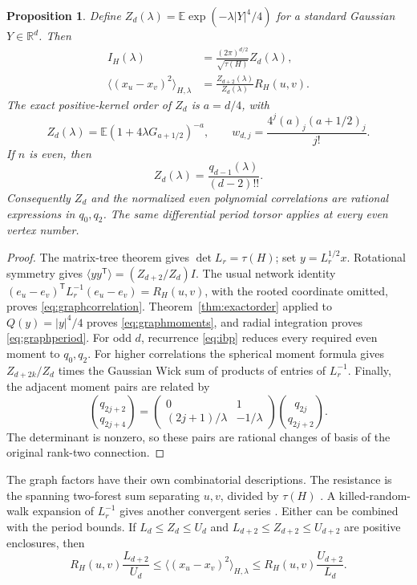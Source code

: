 \documentclass[11pt]{article}
\newtheorem{proposition}[theorem]{Proposition}
\theoremstyle{definition}
\newcommand{\E}{\mathbb E}
\numberwithin{equation}{section}
\begin{document}
\begin{proposition}\label{prop:graphfield}
Define $Z_d(\lambda)=\E\exp(-\lambda |Y|^4/4)$ for a standard Gaussian
$Y\in\mathbb R^d$. Then
\begin{align}
 I_H(\lambda)&=\frac{(2\pi)^{d/2}}{\sqrt{\tau(H)}}Z_d(\lambda),
 \label{eq:graphpartition}\\
 \langle(x_u-x_v)^2\rangle_{H,\lambda}
 &=\frac{Z_{d+2}(\lambda)}{Z_d(\lambda)}R_H(u,v).
 \label{eq:graphcorrelation}
\end{align}
The exact positive-kernel order of $Z_d$ is $a=d/4$, with
\begin{equation}\label{eq:graphmoments}
 Z_d(\lambda)=\E(1+4\lambda G_{a+1/2})^{-a},\qquad
 w_{d,j}=\frac{4^j(a)_j(a+1/2)_j}{j!}.
\end{equation}
If $n$ is even, then
\begin{equation}\label{eq:graphperiod}
 Z_d(\lambda)=\frac{q_{d-1}(\lambda)}{(d-2)!!}.
\end{equation}
Consequently $Z_d$ and the normalized even
polynomial correlations are rational expressions in $q_0,q_2$.
The same differential period torsor applies at every even vertex number.
\end{proposition}
\begin{proof}
The matrix-tree theorem gives $\det L_r=\tau(H)$; set $y=L_r^{1/2}x$.
Rotational symmetry gives
$\langle yy^{\mathsf T}\rangle=(Z_{d+2}/Z_d)I$.
The usual network identity
$(e_u-e_v)^{\mathsf T}L_r^{-1}(e_u-e_v)=R_H(u,v)$, with the rooted
coordinate omitted, proves \eqref{eq:graphcorrelation}.
Theorem~\ref{thm:exactorder} applied to $Q(y)=|y|^4/4$ proves
\eqref{eq:graphmoments}, and radial integration proves
\eqref{eq:graphperiod}. For odd $d$, recurrence \eqref{eq:ibp}
reduces every required even moment to $q_0,q_2$.
For higher correlations the spherical moment formula gives
$Z_{d+2k}/Z_d$ times the Gaussian Wick sum of products of entries
of $L_r^{-1}$. Finally, the adjacent moment pairs are related by
\[
 \binom{q_{2j+2}}{q_{2j+4}}
 =\begin{pmatrix}0&1\\(2j+1)/\lambda&-1/\lambda\end{pmatrix}
   \binom{q_{2j}}{q_{2j+2}}.
\]
The determinant is nonzero, so these pairs are rational changes of
basis of the original rank-two connection.
\end{proof}

The graph factors have their own combinatorial descriptions.
The resistance is the spanning two-forest sum separating $u,v$, divided
by $\tau(H)$ \cite[Theorem 2]{BarrettForests}. A killed-random-walk
expansion of $L_r^{-1}$ gives another convergent series
\cite[Chapter 2]{LyonsPeres}. Either can be combined with the period
bounds. If $L_d\le Z_d\le U_d$ and
$L_{d+2}\le Z_{d+2}\le U_{d+2}$ are positive enclosures, then
\[
 R_H(u,v)\frac{L_{d+2}}{U_d}
 \le\langle(x_u-x_v)^2\rangle_{H,\lambda}
 \le R_H(u,v)\frac{U_{d+2}}{L_d}.
\]
\end{document}
